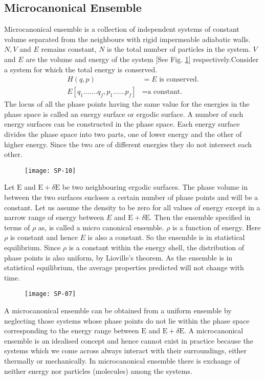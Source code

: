 \subsection{Microcanonical Ensemble}
Microcanonical ensemble is a collection of independent systems of constant volume separated from the neighbours with rigid impermeable adiabatic walls. $N, V$ and $E$ remains constant, $N$ is the total number of particles in the system. $V$ and $E$ are the volume and energy of the system [See Fig. \ref{SP-02}] respectively.Consider a system for which the total energy is conserved.
\begin{align*}
H(q, p)&=E \text{ is conserved.}\\
E\left[q_{1} \ldots \ldots . q_{f}, p_{1} \ldots \ldots p_{f}\right]&=\text{a constant.}
\end{align*}
The locus of all the phase points having the same value for the energies in the phase space is called an energy surface or ergodic surface. A number of such energy surfaces can be constructed in the phase space. Each energy surface divides the phase space into two parts, one of lower energy and the other of higher energy. Since the two are of different energies they do not intersect each other.
\begin{figure}[H]
	\centering
	\texttt{[image: SP-10]}
		\caption{}
		\label{SP-02}
\end{figure}
Let $\mathrm{E}$ and $\mathrm{E}+\delta \mathrm{E}$ be two neighbouring ergodic surfaces. The phase volume in between the two surfaces encloses a certain number of phase points and will be a constant. Let us assume the density to be zero for all values of energy except in a narrow range of energy between $E$ and $\mathrm{E}+\delta \mathrm{E}$. Then the ensemble specified in terms of $\rho$ as, is called a micro canonical ensemble.
$\rho$ is a function of energy. Here $\rho$ is constant and hence $E$ is also a constant. So the ensemble is in statistical equilibrium. Since $\rho$ is a constant within the energy shell, the distribution of phase points is also uniform, by Lioville's theorem. As the ensemble is in statistical equilibrium, the average properties predicted will not change with time.\\
\begin{figure}[H]
	\centering
	\texttt{[image: SP-07]}
\end{figure}
A microcanonical ensemble can be obtained from a uniform ensemble by neglecting those systems whose phase points do not lie within the phase space corresponding to the energy range between $\mathrm{E}$ and $\mathrm{E}+\delta \mathrm{E}$.
A microcanonical ensemble is an idealised concept and hence cannot exist in practice because the systems which we come across always interact with their surroundings, either thermally or mechanically.
In microcanonical ensemble there is exchange of neither energy nor particles (molecules) among the systems.
